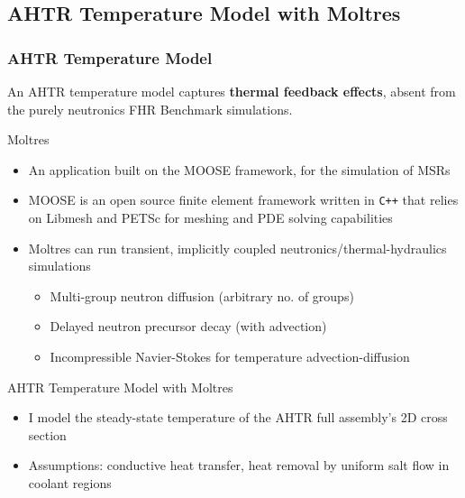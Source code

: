 \subsection{AHTR Temperature Model with Moltres}
\begin{frame}
    \frametitle{AHTR Temperature Model}
    An AHTR temperature model captures \textbf{thermal feedback effects}, absent from 
    the purely neutronics FHR Benchmark simulations. 

    \begin{block}{Moltres \cite{lindsay_introduction_2018}}
        \begin{itemize}
			\item An application built on the \gls{MOOSE} framework, for the simulation of 
            MSRs
            \item \gls{MOOSE} \cite{gaston_moose:_2009} is an open source finite
			element framework written in \texttt{C++} that
			relies on Libmesh and PETSc for meshing and PDE solving capabilities
			\item Moltres can run transient, implicitly coupled
			neutronics/thermal-hydraulics simulations
			\begin{itemize}
				\item Multi-group neutron diffusion (arbitrary no. of groups)
				\item Delayed neutron precursor decay (with advection)
				\item Incompressible Navier-Stokes for temperature
				advection-diffusion
			\end{itemize}
		\end{itemize}
    \vspace{-0.2cm}
    \end{block}
    \begin{block}{AHTR Temperature Model with Moltres}
        \begin{itemize}
            \item I model the steady-state temperature of the AHTR full assembly's 2D 
            cross section
            \item Assumptions: conductive heat transfer, heat removal by uniform 
            salt flow in coolant regions
        \end{itemize}
    \end{block}
\end{frame}

